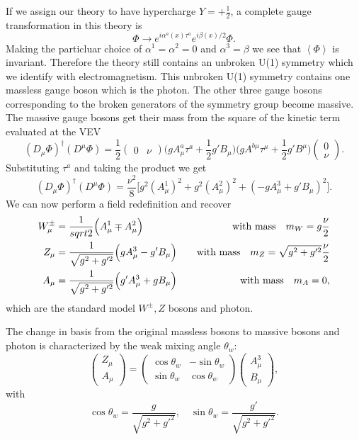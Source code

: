 If we assign our theory to have hypercharge $Y=+\frac{1}{2}$, a complete gauge transformation in this theory is
\begin{equation}
  \Phi\rightarrow e^{i\alpha^a(x)\tau^a}e^{i\beta(x)/2}\Phi.
\end{equation}
Making the particluar choice of $\alpha^1=\alpha^2=0$ and $\alpha^3=\beta$ we see that $\left<\Phi\right>$ is invariant.
Therefore the theory still contains an unbroken U(1) symmetry which we identify with electromagnetism.
This unbroken U(1) symmetry contains one massless gauge boson which is the photon.
The other three gauge bosons corresponding to the broken generators of the symmetry group become massive.
The massive gauge bosons get their mass from the square of the kinetic term evaluated at the VEV
\begin{equation}
  (D_\mu\Phi)^\dagger(D^\mu\Phi)=\frac{1}{2}(\begin{matrix}0& \nu\end{matrix})\Big(gA^a_\mu\tau^a+\frac{1}{2}g'B_\mu\Big)\Big(gA^{b\mu}\tau^\mu+\frac{1}{2}g'B^\mu\Big)\left(\begin{matrix}0\\\nu\end{matrix}\right).
\end{equation}
Substituting $\tau^a$ and taking the product we get
\begin{equation}
  (D_\mu\Phi)^\dagger(D^\mu\Phi)=\frac{\nu^2}{8}\Big[g^2(A^1_\mu)^2+g^2(A^2_\mu)^2+(-gA^3_\mu+g'B_\mu)^2\Big].
\end{equation}
We can now perform a field redefinition and recover
\begin{align}
  W^\pm_\mu&=\frac{1}{sqrt{2}}\Big(A^1_\mu\mp A^2_\mu\Big)&\mbox{\quad with mass\quad} m_W=g\frac{\nu}{2}\\
  Z_\mu&=\frac{1}{\sqrt{g^2+g'^2}}\Big(gA^3_\mu-g'B_\mu\Big)&\mbox{\quad with mass\quad} m_Z=\sqrt{g^2+g'^2}\frac{\nu}{2}\\
  A_\mu&=\frac{1}{\sqrt{g^2+g'^2}}\Big(g'A^3_\mu+gB_\mu\Big)&\mbox{\quad with mass\quad} m_A=0,
\end{align}
which are the standard model $W^\pm, Z$ bosons and photon.

The change in basis from the original massless bosons to massive bosons and photon is characterized by the weak mixing angle $\theta_w$:
\begin{equation}
  \left(\begin{matrix}Z_\mu\\A_\mu\end{matrix}\right)=\left(\begin{matrix}\cos\theta_w & -\sin\theta_w\\\sin\theta_w & \cos\theta_w\end{matrix}\right)\left(\begin{matrix}A^3_\mu\\ B_\mu\end{matrix}\right),
\end{equation}
with
\begin{equation}
  \cos\theta_w=\frac{g}{\sqrt{g^2+g'^2}},\quad\sin\theta_w=\frac{g'}{\sqrt{g^2+g'^2}}.
\end{equation}

